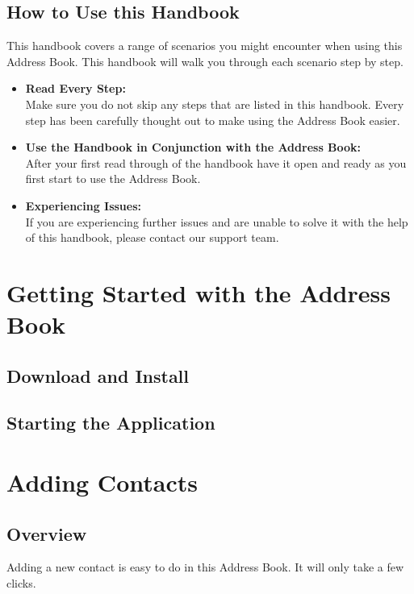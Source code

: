 \documentclass[a4paper, 11pt]{article}
\begin{document}
\subsection{How to Use this Handbook}
This handbook covers a range of scenarios you might encounter when using this Address Book. This handbook will walk you through each scenario step by step.
\begin{itemize}
    \item \textbf{Read Every Step:} \\ Make sure you do not skip any steps that are listed in this handbook. Every step has been carefully thought out to make using the Address Book easier.
    \item \textbf{Use the Handbook in Conjunction with the Address Book:} \\ After your first read through of the handbook have it open and ready as you first start to use the Address Book.
    \item \textbf{Experiencing Issues:} \\ If you are experiencing further issues and are unable to solve it with the help of this handbook, please contact our support team.
\end{itemize}

\clearpage

\section{Getting Started with the Address Book}
\subsection{Download and Install}
\subsection{Starting the Application}

\clearpage

\section{Adding Contacts}
\subsection{Overview}
Adding a new contact is easy to do in this Address Book. It will only take a few clicks.
\end{document}
